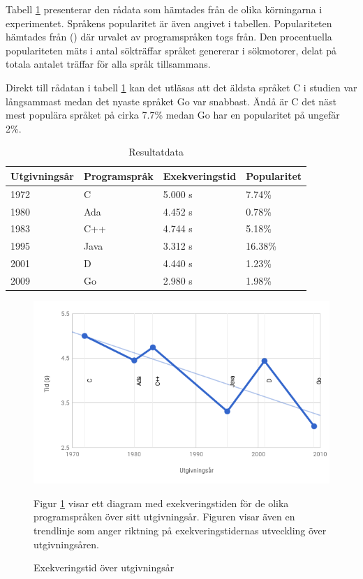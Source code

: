 \documentclass[12pt,swedish]{article}
\begin{document}
\begin{table}[H]
Tabell \ref{table:result} presenterar den rådata som hämtades från de olika körningarna i experimentet. Språkens popularitet är även angivet i tabellen. Populariteten hämtades från \citeauthor{tiobe} (\citeyear{tiobe}) där urvalet av programspråken togs från. Den procentuella populariteten mäts i antal sökträffar språket genererar i sökmotorer, delat på totala antalet träffar för alla språk tillsammans.

Direkt till rådatan i tabell \ref{table:result} kan det utläsas att det äldsta språket C i studien var långsammast medan det nyaste språket Go var snabbast. Ändå är C det näst mest populära språket på cirka 7.7\% medan Go har en popularitet på ungefär 2\%.
\begin{center}
\caption{Resultatdata}
\label{table:result}
\begin{tabular}{@{}llll@{}}
\toprule
Utgivningsår & Programspråk & Exekveringstid & Popularitet \\ \midrule
1972         & C            & 5.000 s        & 7.74\%      \\
1980         & Ada          & 4.452 s        & 0.78\%      \\
1983         & C++          & 4.744 s        & 5.18\%      \\
1995         & Java         & 3.312 s        & 16.38\%     \\
2001         & D            & 4.440 s        & 1.23\%      \\
2009         & Go           & 2.980 s        & 1.98\%      \\ \bottomrule
\end{tabular}
\end{center}
\end{table}

\begin{figure}[H]
\begin{center}
\includegraphics[width=1\textwidth,natwidth=600,natheight=371]{performance.png}
\caption{Exekveringstid över utgivningsår}
\label{figure:performance}
\end{center}
Figur \ref{figure:performance} visar ett diagram med exekveringstiden för de olika programspråken över sitt utgivningsår. Figuren visar även en trendlinje som anger riktning på exekveringstidernas utveckling över utgivningsåren.
\end{figure}
\end{document}
